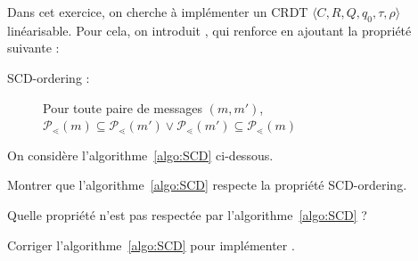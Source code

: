 
\begingroup


\begin{exercice}

  Dans cet exercice, on cherche à implémenter un CRDT $\langle C, R, Q, q_0, \tau, \rho \rangle$ linéarisable.
  Pour cela, on introduit , qui renforce  en ajoutant la propriété suivante :
  \begin{description}
  \item[SCD-ordering :] Pour toute paire de messages $(m, m')$, $\mathscr{P}_{\lessdot}(m) \subseteq \mathscr{P}_{\lessdot}(m') \lor \mathscr{P}_{\lessdot}(m') \subseteq \mathscr{P}_{\lessdot}(m)$
  \end{description}

  On considère l'algorithme~\ref{algo:SCD} ci-dessous. 

  \begin{algorithm}
    \caption{scd-broadcast{scd} (?) dans le modèle $\mathcal{CAMP}_{n, t}[mutual-broadcast]$ (code pour $p_i$)}
    \label{algo:SCD}
  \end{algorithm}

  \begin{questions}
  \item Montrer que l'algorithme~\ref{algo:SCD} respecte la propriété SCD-ordering. 
  \item Quelle propriété n'est pas respectée par l'algorithme~\ref{algo:SCD} ?
  \item Corriger l'algorithme~\ref{algo:SCD} pour implémenter .
  \end{questions}


\end{exercice}

